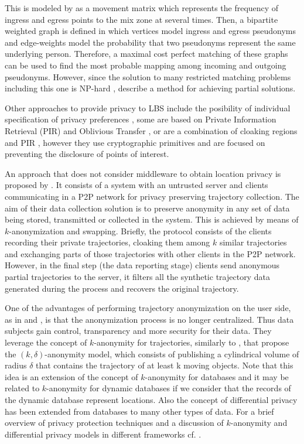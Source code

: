 This is modeled by \cite{Beresford04mixzones} as a movement matrix which represents the frequency of ingress and egress points to the mix zone at several times.
Then, a bipartite weighted graph is defined in which vertices model ingress and egress pseudonyms and edge-weights
model the probability that two pseudonyms represent the same underlying person. Therefore, a maximal cost perfect matching of these graphs can be used to find the most probable mapping among incoming and outgoing pseudonyms.  
However, since the solution to many restricted matching problems including this one is NP-hard \citep{Tanimoto1978}, \cite{Beresford04mixzones} describe a method for achieving partial solutions.

Other approaches to provide privacy to LBS include the posibility of individual specification of privacy preferences \citep{Damiani:2009}, some are based on Private Information Retrieval (PIR) and Oblivious Transfer \citep{Paulet:2014}, or are a combination of cloaking regions and PIR \citep{Ghinita:2011}, however they use cryptographic primitives and are focused on preventing the disclosure of points of interest.

An approach that does not consider middleware to obtain location privacy is proposed by \citet[Chapter 9]{Gidofalvi2007}. It consists of a system with an untrusted server and clients communicating in a P2P network for privacy preserving trajectory collection.
The aim of their data collection solution is to preserve anonymity in any set of data being stored, transmitted or
collected in the system. This is achieved by means of $k$-anonymization and swapping.
Briefly, the protocol consists of the clients recording their private trajectories, cloaking them among $k$ similar trajectories and exchanging parts of those trajectories with other clients in the P2P network. However, in the final step (the data reporting stage) clients send anonymous partial trajectories to the server, it filters all the synthetic trajectory data generated during the process and recovers the original trajectory.

One of the advantages of performing trajectory anonymization on the user side, as in \cite{Romero-Tris2016} and \cite{Romero-Tris:2018}, is that the anonymization process is no longer centralized. Thus data subjects gain control, transparency and more security for their data.
They leverage the concept of $k$-anonymity for trajectories, similarly to \cite{Abul2008}, that propose the $(k, \delta)$-anonymity model, which consists of publishing a cylindrical volume of radius $\delta$ that contains the trajectory of at least k moving objects. 
Note that this idea is an extension of the concept of $k$-anonymity for databases \citep{Samarati:1998} and it may be related to $k$-anonymity for dynamic databases \citep{Salas:2018-b} if we consider that the records of the dynamic database represent locations.  
Also the concept of differential privacy \citep{Dwork:2006} has been extended from databases to many other types of data.
For a brief overview of privacy protection techniques and a discussion of $k$-anonymity and differential privacy models in different frameworks cf. \cite{Salas:2018}.


